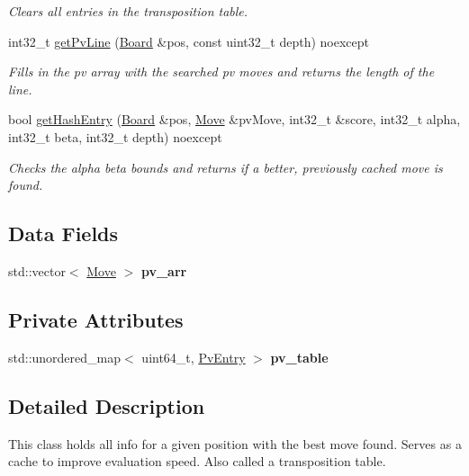 \begin{DoxyCompactItemize}
\begin{DoxyCompactList}\small\item\em Clears all entries in the transposition table. \end{DoxyCompactList}\item 
int32\+\_\+t \mbox{\hyperlink{classPvTable_a6e87189dbe8ce348782ad2423ac14b08}{get\+Pv\+Line}} (\mbox{\hyperlink{classBoard}{Board}} \&pos, const uint32\+\_\+t depth) noexcept
\begin{DoxyCompactList}\small\item\em Fills in the pv array with the searched pv moves and returns the length of the line. \end{DoxyCompactList}\item 
bool \mbox{\hyperlink{classPvTable_a0eb2e071414179f05f606ece66b8e0aa}{get\+Hash\+Entry}} (\mbox{\hyperlink{classBoard}{Board}} \&pos, \mbox{\hyperlink{classMove}{Move}} \&pv\+Move, int32\+\_\+t \&score, int32\+\_\+t alpha, int32\+\_\+t beta, int32\+\_\+t depth) noexcept
\begin{DoxyCompactList}\small\item\em Checks the alpha beta bounds and returns if a better, previously cached move is found. \end{DoxyCompactList}\end{DoxyCompactItemize}
\subsection*{Data Fields}
\begin{DoxyCompactItemize}
\item 
\mbox{\label{classPvTable_aee04d36ed95071d6c553205e0b9de3e5}} 
std\+::vector$<$ \mbox{\hyperlink{classMove}{Move}} $>$ {\bfseries pv\+\_\+arr}
\end{DoxyCompactItemize}
\subsection*{Private Attributes}
\begin{DoxyCompactItemize}
\item 
\mbox{\label{classPvTable_a10751ef66b0018b33e36623c24c44b91}} 
std\+::unordered\+\_\+map$<$ uint64\+\_\+t, \mbox{\hyperlink{classPvEntry}{Pv\+Entry}} $>$ {\bfseries pv\+\_\+table}
\end{DoxyCompactItemize}


\subsection{Detailed Description}
This class holds all info for a given position with the best move found. Serves as a cache to improve evaluation speed. Also called a transposition table. 

